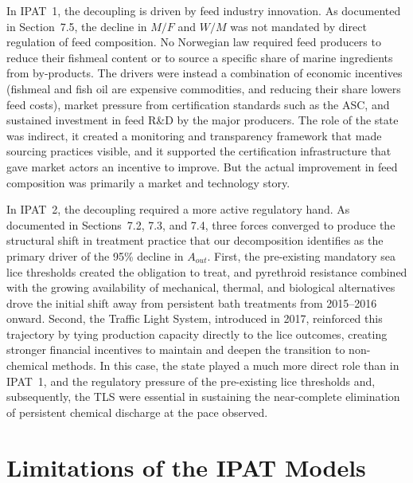 \documentclass[12pt, a4paper]{report}
\begin{document}
In IPAT~1, the decoupling is driven by feed industry
innovation. As documented in Section~7.5, the decline in $M/F$ and
$W/M$ was not mandated by direct regulation of feed composition. No
Norwegian law required feed producers to reduce their fishmeal content
or to source a specific share of marine ingredients from by-products.
The drivers were instead a combination of economic incentives (fishmeal and fish oil are expensive commodities, and reducing their
share lowers feed costs), market pressure from certification
standards such as the ASC, and sustained investment in feed R\&D by
the major producers. The role of the state was indirect, it created
a monitoring and transparency framework that made sourcing practices
visible, and it supported the certification infrastructure that gave
market actors an incentive to improve. But the actual improvement in
feed composition was primarily a market and technology story.

In IPAT~2, the decoupling required a more active regulatory hand.
As documented in Sections~7.2, 7.3, and 7.4, three forces converged
to produce the structural shift in treatment practice that our
decomposition identifies as the primary driver of the 95\% decline
in $A_{out}$. First, the pre-existing mandatory sea lice thresholds
created the obligation to treat, and pyrethroid resistance combined
with the growing availability of mechanical, thermal, and biological
alternatives drove the initial shift away from persistent bath
treatments from 2015--2016 onward. Second, the Traffic Light System,
introduced in 2017, reinforced this trajectory by tying production
capacity directly to the lice outcomes, creating stronger financial
incentives to maintain and deepen the transition to non-chemical
methods. In this case, the state played a much more direct role than
in IPAT~1, and the regulatory pressure of the pre-existing lice
thresholds and, subsequently, the TLS were essential in sustaining
the near-complete elimination of persistent chemical discharge at the
pace observed.

\section{Limitations of the IPAT Models}
\end{document}
